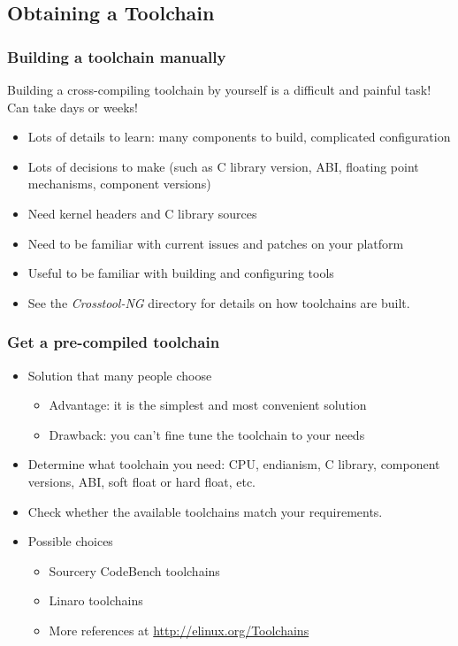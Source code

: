 \subsection{Obtaining a Toolchain}

\begin{frame}
  \frametitle{Building a toolchain manually}

  Building a cross-compiling toolchain by yourself is a difficult and painful
  task! Can take days or weeks!
  \begin{itemize}
  \item Lots of details to learn: many components to build, complicated
    configuration
  \item Lots of decisions to make (such as C library version, ABI, floating point
    mechanisms, component versions)
  \item Need kernel headers and C library sources
  \item Need to be familiar with current  issues and patches
    on your platform
  \item Useful to be familiar with building and configuring tools
  \item See the {\em Crosstool-NG}  directory for details
    on how toolchains are built.
\end{itemize}
\end{frame}

\begin{frame}
  \frametitle{Get a pre-compiled toolchain}
  \begin{itemize}
  \item Solution that many people choose
    \begin{itemize}
    \item Advantage: it is the simplest and most convenient solution
    \item Drawback: you can't fine tune the toolchain to your needs
    \end{itemize}
  \item Determine what toolchain you need: CPU, endianism, C library, component
    versions, ABI, soft float or hard float, etc.
  \item Check whether the available toolchains match your requirements.
  \item Possible choices
    \begin{itemize}
    \item Sourcery CodeBench toolchains
    \item Linaro toolchains
    \item More references at \url{http://elinux.org/Toolchains}
    \end{itemize}
  \end{itemize}
\end{frame}

